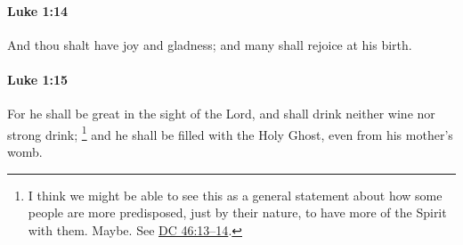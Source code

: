		\paragraph{Luke 1:14} %
			\label{LUKE-1-14}

			And thou shalt have joy and gladness; and many shall rejoice at his birth.

			\begin{framed}
			\scriptsize
				\begin{compactdesc}
					\item[SBLG] 
				\end{compactdesc}
			\end{framed}

		\paragraph{Luke 1:15} %
			\label{LUKE-1-15}

			For he shall be great in the sight of the Lord, and shall drink neither wine nor strong drink;
				\footnote{%
					I think we might be able to see this as a general statement about how some people are more predisposed, just by their nature, to have more of the Spirit with them. Maybe. See \hyperref[DC46-13]{DC 46:13--14}.
					}%
			and he shall be filled with the Holy Ghost, even from his mother's womb.

